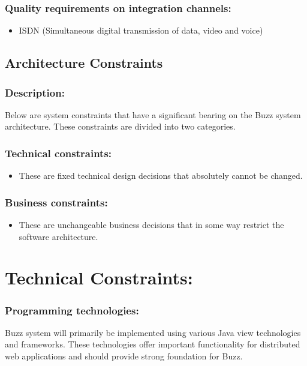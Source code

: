 \documentclass[11pt]{article}
\begin{document}
			\subsubsection{Quality requirements on integration channels:}
			\begin{itemize}			
			
				\item ISDN (Simultaneous digital transmission of data, video and voice)
				
			\end{itemize}	

	\newpage
	\begin{center}
	\section{\textbf{\huge{Architecture Constraints}}}
	\end{center}
		\subsubsection{Description:}
		\textbf{}Below are system constraints that have a significant bearing on the Buzz system architecture.
		These constraints are divided into two categories.
		
		
	
	\subsubsection{Technical constraints:}
	\begin{itemize}
		\item These are fixed technical design decisions that absolutely cannot be changed.
	\end{itemize}
	\subsubsection{Business constraints:}
	\begin{itemize}
		\item These are unchangeable business decisions that in some way restrict the software architecture.
	\end{itemize}
	
	\section{Technical Constraints:}
		\subsubsection{	Programming technologies:}
			\textbf{}Buzz system will primarily be implemented using various Java view technologies and frameworks. These technologies offer important functionality for distributed web applications and should provide strong foundation for Buzz.
		
\end{document}
